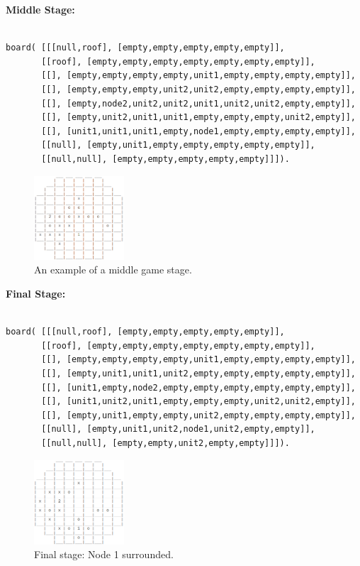 \documentclass[a4paper]{article}
\begin{document}
\textbf{Middle Stage:}

\begin{lstlisting}

board( [[[null,roof], [empty,empty,empty,empty,empty]],
       [[roof], [empty,empty,empty,empty,empty,empty,empty]],
       [[], [empty,empty,empty,empty,unit1,empty,empty,empty,empty]],
       [[], [empty,empty,empty,unit2,unit2,empty,empty,empty,empty]],
       [[], [empty,node2,unit2,unit2,unit1,unit2,unit2,empty,empty]],
       [[], [empty,unit2,unit1,unit1,empty,empty,empty,unit2,empty]],
       [[], [unit1,unit1,unit1,empty,node1,empty,empty,empty,empty]],
       [[null], [empty,unit1,empty,empty,empty,empty,empty]],
       [[null,null], [empty,empty,empty,empty,empty]]]).
\end{lstlisting}

\begin{figure}[h!]
	\centering
	\includegraphics[width=0.3\textwidth]{MidGame.png}
	\caption{An example of a middle game stage.}
	\label{Image: midgame}
\end{figure}

\textbf{Final Stage:}

\begin{lstlisting}

board( [[[null,roof], [empty,empty,empty,empty,empty]],
       [[roof], [empty,empty,empty,empty,empty,empty,empty]],
       [[], [empty,empty,empty,empty,unit1,empty,empty,empty,empty]],
       [[], [empty,unit1,unit1,unit2,empty,empty,empty,empty,empty]],
       [[], [unit1,empty,node2,empty,empty,empty,empty,empty,empty]],
       [[], [unit1,unit2,unit1,empty,empty,empty,unit2,unit2,empty]],
       [[], [empty,unit1,empty,empty,unit2,empty,empty,empty,empty]],
       [[null], [empty,unit1,unit2,node1,unit2,empty,empty]],
       [[null,null], [empty,empty,unit2,empty,empty]]]).
\end{lstlisting}


\begin{figure}[h!]
	\centering
	\includegraphics[width=0.3\textwidth]{FinalGame.png}
	\caption{Final stage: Node 1 surrounded.}
	\label{Image: finalgame}
\end{figure}
\end{document}
